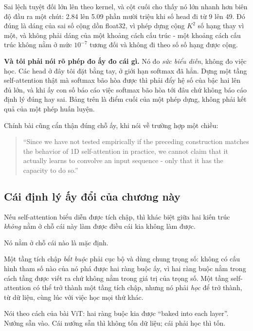 Sai lệch tuyệt đối lớn lên theo kernel, và cột cuối cho thấy nó lớn nhanh hơn
biên độ đầu ra một chút: 2.84 lên 5.09 phần mười triệu khi số head đi từ 9 lên
49. Đó đúng là dáng của sai số cộng dồn float32, vì phép dựng cộng \(K^2\) số
hạng thay vì một, và không phải dáng của một khoảng cách cấu trúc - một khoảng
cách cấu trúc không nằm ở mức \(10^{-7}\) tương đối và không đi theo số số hạng
được cộng.

\textbf{Và tôi phải nói rõ phép đo ấy đo cái gì.} Nó đo \emph{sức biểu diễn},
không đo việc học. Các head ở đây tôi đặt bằng tay, ở giới hạn softmax đã
 hẳn. Dựng một tầng self-attention thật mà softmax bão
hòa được thì phải đẩy hệ số của  bậc hai
lên đủ lớn, và khi ấy con số báo cáo việc
softmax bão hòa tới đâu chứ không báo cáo định lý đúng hay sai. Bảng trên là
điểm cuối của một phép dựng, không phải kết quả của một phép huấn luyện.

Chính bài cũng cẩn thận đúng chỗ ấy, khi nói về trường hợp một chiều:

\begin{quote}
\enquote{Since we have not tested empirically if the preceding construction
matches the behavior of 1D self-attention in practice, we cannot claim that it
actually learns to convolve an input sequence - only that it has the capacity
to do so.}
\end{quote}

\subsection*{Cái định lý ấy đổi của chương này}

%
Nếu self-attention biểu diễn được tích chập, thì khác biệt giữa hai kiến trúc
\emph{không} nằm ở chỗ cái này làm được điều cái kia không làm được.

Nó nằm ở chỗ cái nào là mặc định.

Một tầng tích chập \emph{bắt buộc} phải cục bộ và dùng chung trọng số: không có
cấu hình tham số nào của nó phá được hai ràng buộc ấy, vì hai ràng buộc nằm
trong cách tầng được viết ra chứ không nằm trong giá trị của trọng số. Một tầng
self-attention có thể trở thành một tầng tích chập, nhưng nó phải \emph{học}
để trở thành, từ dữ liệu, cùng lúc với việc học mọi thứ khác.

Nói theo cách của bài ViT: hai ràng buộc kia được \enquote{baked into each
layer}. Nướng sẵn vào. Cái nướng sẵn thì không tốn dữ liệu; cái phải học thì
tốn.

